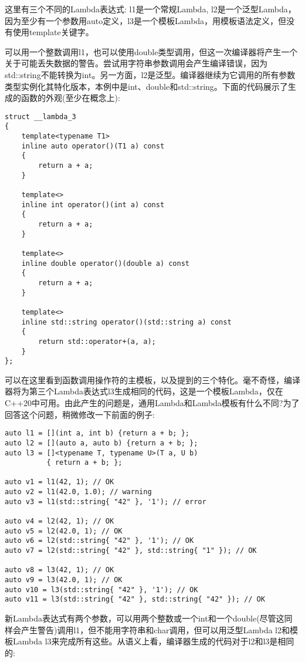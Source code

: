 这里有三个不同的Lambda表达式: l1是一个常规Lambda, l2是一个泛型Lambda，因为至少有一个参数用auto定义，l3是一个模板Lambda，用模板语法定义，但没有使用template关键字。

可以用一个整数调用l1，也可以使用double类型调用，但这一次编译器将产生一个关于可能丢失数据的警告。尝试用字符串参数调用会产生编译错误，因为std::string不能转换为int。另一方面，l2是泛型。编译器继续为它调用的所有参数类型实例化其特化版本，本例中是int、double和std::string。下面的代码展示了生成的函数的外观(至少在概念上):

\begin{lstlisting}[style=styleCXX]
struct __lambda_3
{
	template<typename T1>
	inline auto operator()(T1 a) const
	{
		return a + a;
	}

	template<>
	inline int operator()(int a) const
	{
		return a + a;
	}

	template<>
	inline double operator()(double a) const
	{
		return a + a;
	}

	template<>
	inline std::string operator()(std::string a) const
	{
		return std::operator+(a, a);
	}
};
\end{lstlisting}

可以在这里看到函数调用操作符的主模板，以及提到的三个特化。毫不奇怪，编译器将为第三个Lambda表达式l3生成相同的代码，这是一个模板Lambda，仅在C++20中可用。由此产生的问题是，通用Lambda和Lambda模板有什么不同?为了回答这个问题，稍微修改一下前面的例子:

\begin{lstlisting}[style=styleCXX]
auto l1 = [](int a, int b) {return a + b; };
auto l2 = [](auto a, auto b) {return a + b; };
auto l3 = []<typename T, typename U>(T a, U b)
          { return a + b; };
          
auto v1 = l1(42, 1); // OK
auto v2 = l1(42.0, 1.0); // warning
auto v3 = l1(std::string{ "42" }, '1'); // error

auto v4 = l2(42, 1); // OK
auto v5 = l2(42.0, 1); // OK
auto v6 = l2(std::string{ "42" }, '1'); // OK
auto v7 = l2(std::string{ "42" }, std::string{ "1" }); // OK

auto v8 = l3(42, 1); // OK
auto v9 = l3(42.0, 1); // OK
auto v10 = l3(std::string{ "42" }, '1'); // OK
auto v11 = l3(std::string{ "42" }, std::string{ "42" }); // OK
\end{lstlisting}

新Lambda表达式有两个参数，可以用两个整数或一个int和一个double(尽管这同样会产生警告)调用l1，但不能用字符串和char调用，但可以用泛型Lambda l2和模板Lambda l3来完成所有这些。从语义上看，编译器生成的代码对于l2和l3是相同的:

